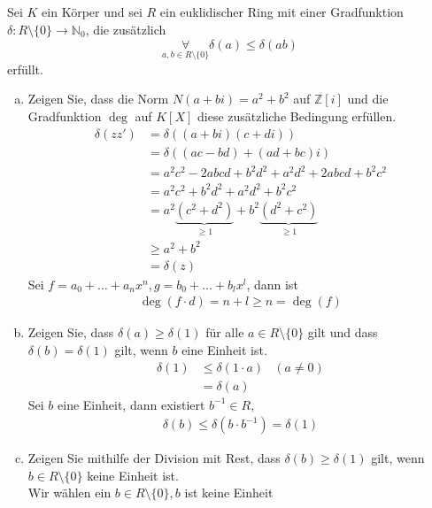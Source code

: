 \documentclass{article}
\newcommand{\N}{\mathbb{N}}
\newcommand{\Z}{\mathbb{Z}}
\begin{document}
\subsection{}
\color{blue}
Sei $K$ ein Körper und sei $R$ ein euklidischer Ring mit
einer Gradfunktion $\delta:R\setminus\{0\}\rightarrow\N_0$,
die zusätzlich
\begin{equation*}
    \underset{a,b\in R\setminus\{0\}}\forall
    \delta(a)\leq\delta(ab)
\end{equation*}
erfüllt.
\color{black}
\begin{enumerate}[(a)]
    \item
        \color{blue}
        Zeigen Sie, dass die Norm $N(a+bi)=a^2+b^2$ auf
        $\Z[i]$ und die Gradfunktion $\deg$ auf
        $K[X]$ diese zusätzliche Bedingung erfüllen.\\
        \color{black}
        \begin{align*}
            \delta(zz')&=\delta((a+bi)(c+di))\\
            &=\delta((ac-bd)+(ad+bc)i)\\
            &=a^2c^2-2abcd+b^2d^2+a^2d^2+2abcd+b^2c^2\\
            &=a^2c^2+b^2d^2+a^2d^2+b^2c^2\\
            &=a^2\underbrace{(c^2+d^2)}_{\geq 1}+b^2
            \underbrace{(d^2+c^2)}_{\geq 1}\\
            &\geq a^2+b^2\\
            &=\delta(z)
        \end{align*}
        Sei $f=a_0+\hdots+a_nx^n,g=b_0+\hdots+b_lx^l$,
        dann ist
        \begin{align*}
            \deg(f\cdot d)=n+l\geq n=\deg(f)
        \end{align*}
    \item
        \color{blue}
        Zeigen Sie, dass $\delta(a)\geq\delta(1)$ für alle
        $a\in R\setminus\{0\}$ gilt und dass $\delta(b)=
        \delta(1)$ gilt, wenn $b$ eine Einheit ist.\\
        \color{black}
        \begin{align*}
            \delta(1)&\leq\delta(1\cdot a)&(a\neq 0)\\
            &=\delta(a)
        \end{align*}
        Sei $b$ eine Einheit, dann existiert $b^{-1}\in R$,
        \begin{align*}
            \delta(b)\leq\delta(b\cdot b^{-1})=\delta(1)
        \end{align*}
    \item
        \color{blue}
        Zeigen Sie mithilfe der Division mit Rest, dass
        $\delta(b)\geq\delta(1)$ gilt, wenn
        $b\in R\setminus\{0\}$ keine Einheit ist.\\
        \color{black}
        Wir wählen ein $b\in R\setminus\{0\}, b$ ist keine
        Einheit


\end{enumerate}
\end{document}
